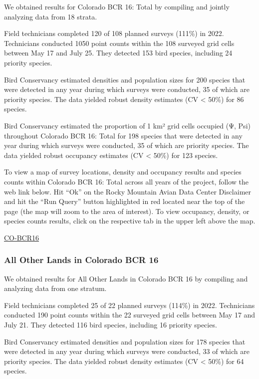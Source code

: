 \documentclass[
  letterpaper,
  DIV=11,
  numbers=noendperiod,
  oneside]{scrreprt}
\begin{document}
We obtained results for Colorado BCR 16: Total by compiling and jointly
analyzing data from 18 strata.

Field technicians completed 120 of 108 planned surveys (111\%) in 2022.
Technicians conducted 1050 point counts within the 108 surveyed grid
cells between May 17 and July 25. They detected 153 bird species,
including 24 priority species.

Bird Conservancy estimated densities and population sizes for 200
species that were detected in any year during which surveys were
conducted, 35 of which are priority species. The data yielded robust
density estimates (CV \textless{} 50\%) for 86 species.

Bird Conservancy estimated the proportion of 1 km² grid cells occupied
(Ψ, Psi) throughout Colorado BCR 16: Total for 198 species that were
detected in any year during which surveys were conducted, 35 of which
are priority species. The data yielded robust occupancy estimates (CV
\textless{} 50\%) for 123 species.

To view a map of survey locations, density and occupancy results and
species counts within Colorado BCR 16: Total across all years of the
project, follow the web link below. Hit ``Ok'' on the Rocky Mountain
Avian Data Center Disclaimer and hit the ``Run Query'' button
highlighted in red located near the top of the page (the map will zoom
to the area of interest). To view occupancy, density, or species counts
results, click on the respective tab in the upper left above the map.

\href{http://www.rmbo.org/new_site/adc/QueryWindow.aspx\#N4IgzgrgDgpgTmALnAhoiBbEAuABCAYQHkBaAIQICUBGANhAF8g=}{CO-BCR16}

\hypertarget{all-other-lands-in-colorado-bcr-16}{%
\subsubsection{All Other Lands in Colorado BCR
16}\label{all-other-lands-in-colorado-bcr-16}}

We obtained results for All Other Lands in Colorado BCR 16 by compiling
and analyzing data from one stratum.

Field technicians completed 25 of 22 planned surveys (114\%) in 2022.
Technicians conducted 190 point counts within the 22 surveyed grid cells
between May 17 and July 21. They detected 116 bird species, including 16
priority species.

Bird Conservancy estimated densities and population sizes for 178
species that were detected in any year during which surveys were
conducted, 33 of which are priority species. The data yielded robust
density estimates (CV \textless{} 50\%) for 64 species.
\end{document}

